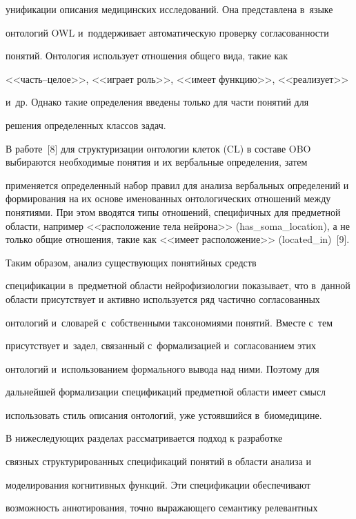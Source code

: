 унификации описания медицинских исследований. Она представлена в~языке 

онтологий OWL и~поддерживает автоматическую проверку согласованности

 понятий. Онтология использует отношения общего вида, такие как 

<<часть--це\-лое>>, <<играет роль>>, <<имеет функцию>>, <<реализует>>

 и~др. Однако такие определения введены только для части понятий для

 решения определенных классов задач.

      

      В работе~[8] для структуризации онтологии клеток (CL) в составе OBO выбираются необходимые понятия и их вербальные определения, затем 

применяется определенный набор правил для анализа вербальных определений и формирования на их основе именованных онтологических отношений между понятиями. При этом вводятся типы отношений, специфичных для предметной области, например <<расположение тела нейрона>> (has\_soma\_location), а не только общие отношения, такие как <<имеет расположение>> (located\_in)~[9].

      

      Таким образом, анализ существующих понятийных средств 

спецификации в~предметной области нейрофизиологии показывает, что в~данной области присутствует и активно используется ряд частично согласованных 

онтологий и~словарей с~собственными таксономиями понятий. Вместе с~тем 

присутствует и~задел, связанный с~формализацией и~согласованием этих 

онтологий и~использованием формального вывода над ними. Поэтому для 

дальнейшей формализации спецификаций предметной области имеет смысл 

использовать стиль описания онтологий, уже устоявшийся в~биомедицине.

      

      В нижеследующих разделах рассматривается подход к разработке 

связных структурированных спецификаций понятий в области анализа и 

моделирования когнитивных функций. Эти спецификации обеспечивают 

возможность аннотирования, точно выражающего семантику релевантных 

